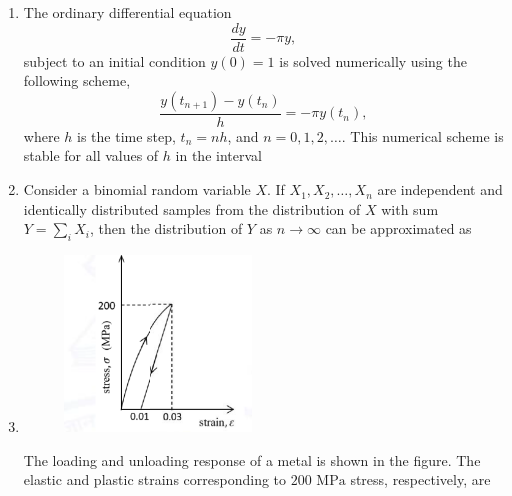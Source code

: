 \documentclass[journal]{IEEEtran}
\begin{document}
\begin{enumerate}
\hfill{}

\item The ordinary differential equation
\[
\frac{dy}{dt} = -\pi y,
\]
subject to an initial condition $y(0) = 1$ is solved numerically using the following scheme,
\[
\frac{y(t_{n+1}) - y(t_n)}{h} = -\pi y(t_n),
\]
where $h$ is the time step, $t_n = nh$, and $n = 0, 1, 2, \dots$. This numerical scheme
is stable for all values of $h$ in the interval

\begin{enumerate}
\end{enumerate}

\hfill{}

\item Consider a binomial random variable $X$. If $X_1, X_2, \ldots, X_n$ are independent and identically distributed samples from the distribution of $X$ with sum $Y = \sum_i X_i$, then the distribution of $Y$ as $n \rightarrow \infty$ can be approximated as

\begin{enumerate}
\end{enumerate}

\hfill{}

\item
\begin{figure}[h]
\centering
\includegraphics[width=0.5\columnwidth]{Figs/image (41).png}
\caption*{}
\label{fig:6}
\end{figure}
The loading and unloading response of a metal is shown in the figure. The elastic and plastic strains corresponding to $200 \text{ MPa}$ stress, respectively, are


\end{enumerate}
\end{document}
